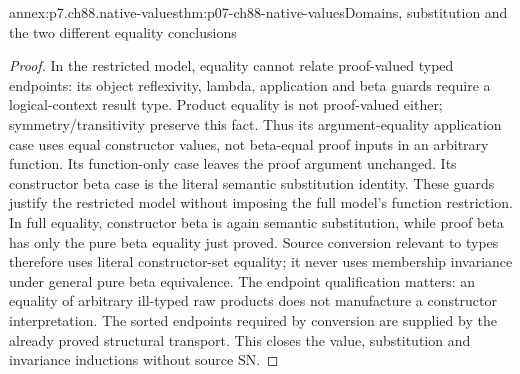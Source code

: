 \begin{annexitem}{annex:p7.ch88.native-values}{thm:p07-ch88-native-values}{Domains, substitution and the two different equality conclusions}
\begin{proof}
In the restricted model, equality cannot relate proof-valued typed endpoints:
its object reflexivity, lambda, application and beta guards require a
logical-context result type. Product equality is not proof-valued either;
symmetry/transitivity preserve this fact. Thus its argument-equality
application case uses equal constructor values, not beta-equal proof inputs
in an arbitrary function. Its function-only case leaves the proof argument
unchanged. Its constructor beta case is the literal semantic substitution
identity. These guards justify the restricted model without imposing the
full model's function restriction. In full equality, constructor beta is
again semantic substitution, while proof beta has only the pure beta
equality just proved. Source conversion relevant to types therefore uses
literal constructor-set equality; it never uses membership invariance
under general pure beta equivalence. The endpoint qualification matters:
an equality of arbitrary ill-typed raw products does not manufacture a
constructor interpretation. The sorted endpoints required by conversion
are supplied by the already proved structural transport. This closes
the value, substitution and invariance inductions without source SN.
\end{proof}
\end{annexitem}

